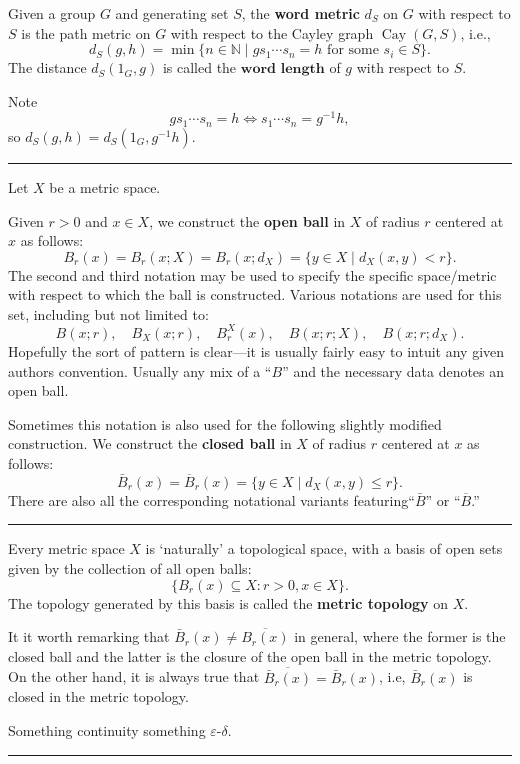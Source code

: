 \documentclass[12pt]{article}
\newcommand{\keyword}[1]{\textbf{#1}}
\newcommand{\sepline}{\rule{\textwidth}{0.4pt}}
\theoremstyle{definition}
\newcommand{\N}{\mathbb{N}}
\newcommand{\eps}{\varepsilon}
\newcommand{\<}{\left\langle}
\renewcommand{\>}{\right\rangle}
\newcommand{\seq}{\subseteq}
\DeclareMathOperator{\Cay}{Cay}
\newcommand{\clo}{\overline}
\begin{document}
Given a group $G$ and generating set $S$, the \keyword{word metric} $d_S$ on $G$ with respect to $S$ is the path metric on $G$ with respect to the Cayley graph $\Cay(G, S)$, i.e.,
\[
    d_S(g, h) = \min\{n \in \N \mid gs_1 \cdots s_n = h \text{ for some } s_i \in S\}.
\]
The distance $d_S(1_G, g)$ is called the $\keyword{word length}$ of $g$ with respect to $S$.

Note
\[
    gs_1 \cdots s_n = h \iff s_1 \cdots s_n = g^{-1}h,
\]
so $d_S(g, h) = d_S(1_G, g^{-1}h)$.

\sepline


Let $X$ be a metric space.

Given $r > 0$ and $x \in X$, we construct the \keyword{open ball} in $X$ of radius $r$ centered at $x$ as follows:
\[
    B_r(x) = B_r(x; X) = B_r(x; d_X) = \{y \in X \mid d_X(x, y) < r\}.
\]
The second and third notation may be used to specify the specific space/metric with respect to which the ball is constructed.
Various notations are used for this set, including but not limited to:
\[
    B(x; r), \quad B_X(x; r), \quad B^X_r(x), \quad B(x; r; X), \quad B(x; r; d_X).
\]
Hopefully the sort of pattern is clear---it is usually fairly easy to intuit any given authors convention.
Usually any mix of a ``$B$'' and the necessary data denotes an open ball.

Sometimes this notation is also used for the following slightly modified construction.
We construct the \keyword{closed ball} in $X$ of radius $r$ centered at $x$ as follows:
\[
    \bar{B}_r(x) = \clo{B}_r(x) = \{y \in X \mid d_X(x, y) \leq r\}.
\]
There are also all the corresponding notational variants featuring``$\bar{B}$'' or ``$\clo{B}$.'' 




\sepline

Every metric space $X$ is `naturally' a topological space, with a basis of open sets given by the collection of all open balls:
\[
    \{B_r(x) \seq X : r > 0, x \in X\}.
\]
The topology generated by this basis is called the \keyword{metric topology} on $X$.

It it worth remarking that $\bar{B}_r(x) \ne \clo{B_r(x)}$ in general, where the former is the closed ball and the latter is the closure of the open ball in the metric topology.
On the other hand, it is always true that $\clo{\bar{B}_r(x)} = \bar{B}_r(x)$, i.e, $\bar{B}_r(x)$ is closed in the metric topology.

Something continuity something $\eps$-$\delta$.

\sepline
\end{document}
